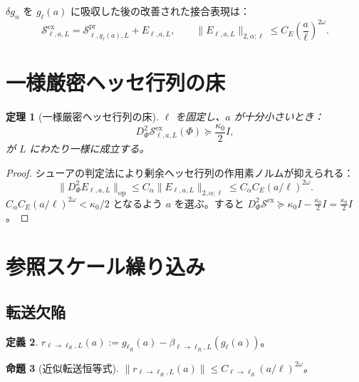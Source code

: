 \documentclass[12pt]{article}
\theoremstyle{plain}
\newtheorem{theorem}{定理}[section]
\newtheorem{proposition}[theorem]{命題}
\theoremstyle{definition}
\newtheorem{definition}[theorem]{定義}
\numberwithin{equation}{section}
\newcommand{\pr}{\mathrm{pr}}
\newcommand{\ex}{\mathrm{ex}}
\begin{document}
$\delta g_n$ を $g_\ell(a)$ に吸収した後の改善された接合表現は：
\begin{equation}
\boxed{\mathcal{S}^{\ex}_{\ell,a,L} = \mathcal{S}^{\pr}_{\ell,g_\ell(a),L} + E_{\ell,a,L},\qquad
\|E_{\ell,a,L}\|_{2,\alpha;\ell} \leq C_E\left(\frac{a}{\ell}\right)^{2\omega}.}
\end{equation}


\section{一様厳密ヘッセ行列の床}\label{sec:hessianfloor}

\begin{theorem}[一様厳密ヘッセ行列の床]\label{thm:exacthessianfloor}
$\ell$ を固定し、$a$ が十分小さいとき：
\begin{equation}
D_\Phi^2\mathcal{S}^{\ex}_{\ell,a,L}(\Phi) \succeq \frac{\kappa_0}{2}I,
\end{equation}
が $L$ にわたり一様に成立する。
\end{theorem}

\begin{proof}
シューアの判定法により剰余ヘッセ行列の作用素ノルムが抑えられる：
\begin{equation}
\|D_\Phi^2 E_{\ell,a,L}\|_{\mathrm{op}} \leq C_\alpha\|E_{\ell,a,L}\|_{2,\alpha;\ell} \leq C_\alpha C_E(a/\ell)^{2\omega}.
\end{equation}
$C_\alpha C_E(a/\ell)^{2\omega}<\kappa_0/2$ となるよう $a$ を選ぶ。すると $D_\Phi^2\mathcal{S}^{\ex}\succeq\kappa_0 I-\frac{\kappa_0}{2}I=\frac{\kappa_0}{2}I$。
\end{proof}


\section{参照スケール繰り込み}\label{sec:refscale}

\subsection{転送欠陥}

\begin{definition}
$r_{\ell\to\ell_R,L}(a):=g_{\ell_R}(a)-\beta_{\ell\to\ell_R,L}(g_\ell(a))$。
\end{definition}

\begin{proposition}[近似転送恒等式]\label{prop:transportdefect}
$\|r_{\ell\to\ell_R,L}(a)\|\leq C_{\ell\to\ell_R}(a/\ell)^{2\omega}$。
\end{proposition}
\end{document}

